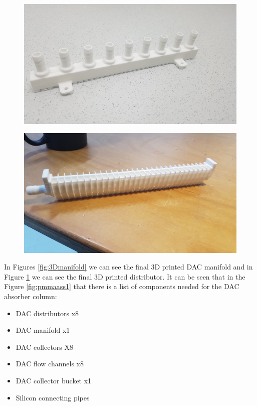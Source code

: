 \begin{figure}[H]
\centering
\begin{minipage}{.5\textwidth}
  \centering
  \includegraphics[width=0.9\linewidth]{images/mywork/Sprint1/Manifold.jpg}
  \label{fig:3Dmanifold}
\end{minipage}%
\begin{minipage}{.5\textwidth}
  \centering
  \includegraphics[width=0.9\linewidth]{images/mywork/Sprint1/Distributor.jpg}
  \label{fig:3Ddistributor}
\end{minipage}
\end{figure}

In Figures \ref{fig:3Dmanifold} we can see the final 3D printed DAC manifold and in Figure \ref{fig:3Ddistributor} we can see the final 3D printed distributor. It can be seen that in the Figure \ref{fig:pmmaass1} that there is a list of components needed for the DAC absorber column: 
\begin{itemize}
    \item DAC distributors x8 
    \item DAC manifold x1 
    \item DAC collectors X8 
    \item DAC flow channels x8
    \item DAC collector bucket x1 
    \item Silicon connecting pipes
\end{itemize}

